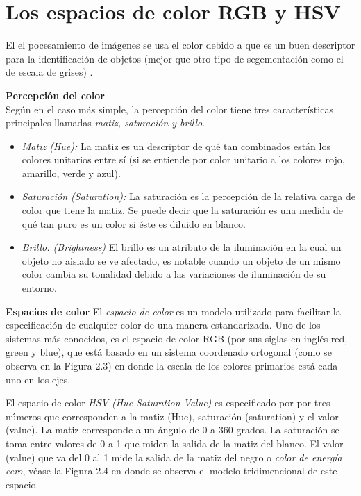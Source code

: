 \documentclass{book}
\begin{document}
\section{Los espacios de color RGB y HSV}
El el pocesamiento de imágenes se usa el color debido a que es un buen descriptor para la identificación de objetos (mejor que otro tipo de segementación como el de escala de grises) \cite{gonzalez2002digital}.

\textbf{Percepción del color}\\
Según \cite{agoston2005computer} en el caso más simple, la percepción del color tiene tres características principales llamadas \textit{matiz, saturación y brillo}. 
\begin{itemize}
\item \textit{Matiz (Hue):} La matiz es un descriptor de qué tan combinados están los colores unitarios entre sí (si se entiende por color unitario a los colores rojo, amarillo, verde y azul).

\item \textit{Saturación (Saturation): } La saturación es la percepción de la relativa carga de color que tiene la matiz. Se puede decir que la saturación es una medida de qué tan puro es un color si éste es diluido en blanco.

\item \textit{Brillo: (Brightness)} El brillo es un atributo de la iluminación en la cual un objeto no aislado se ve afectado, es notable cuando un objeto de un  mismo color cambia su tonalidad debido a las variaciones de iluminación de su entorno.
\end{itemize}

\textbf{Espacios de color}
El \textit{espacio de color} es un modelo utilizado para facilitar la especificación de cualquier color de una manera estandarizada. Uno de los sistemas más conocidos, es el espacio de color RGB (por sus siglas en inglés red, green y blue), que está basado en un sistema coordenado ortogonal (como se observa en la Figura 2.3) en donde la escala de los colores primarios está cada uno en los ejes.

El espacio de color \textit{HSV (Hue-Saturation-Value)} es especificado por por tres números que corresponden a la matiz (Hue), saturación (saturation) y el valor (value). La matiz corresponde a un ángulo de 0 a 360 grados. La saturación se toma entre valores de 0 a 1 que miden la salida de la matiz del blanco. El valor (value) que va del 0 al 1 mide la salida de la matiz del negro o \textit{color de energía cero}, véase la Figura 2.4 en donde se observa el modelo tridimencional de este espacio.
\end{document}
